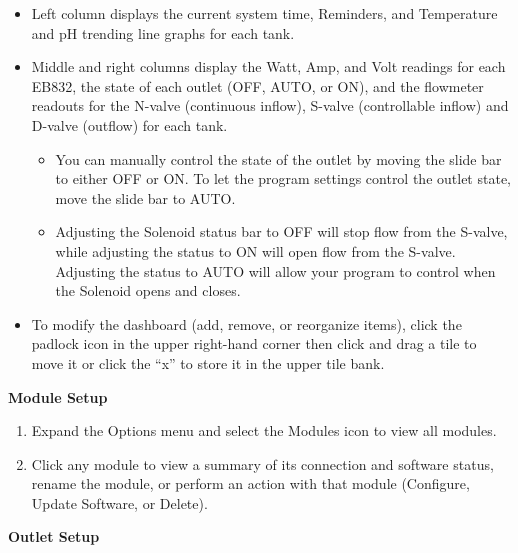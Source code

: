 \documentclass[
]{book}
\providecommand{\tightlist}{%
  \setlength{\itemsep}{0pt}\setlength{\parskip}{0pt}}
\begin{document}
\begin{itemize}
\tightlist
\item
  Left column displays the current system time, Reminders, and Temperature and pH trending line graphs for each tank.
\item
  Middle and right columns display the Watt, Amp, and Volt readings for each EB832, the state of each outlet (OFF, AUTO, or ON), and the flowmeter readouts for the N-valve (continuous inflow), S-valve (controllable inflow) and D-valve (outflow) for each tank.

  \begin{itemize}
  \tightlist
  \item
    You can manually control the state of the outlet by moving the slide bar to either OFF or ON. To let the program settings control the outlet state, move the slide bar to AUTO.
  \item
    Adjusting the Solenoid status bar to OFF will stop flow from the S-valve, while adjusting the status to ON will open flow from the S-valve. Adjusting the status to AUTO will allow your program to control when the Solenoid opens and closes.
  \end{itemize}
\item
  To modify the dashboard (add, remove, or reorganize items), click the padlock icon in the upper right-hand corner then click and drag a tile to move it or click the ``x'' to store it in the upper tile bank.
\end{itemize}

\textbf{Module Setup}

\begin{enumerate}
\def\labelenumi{\arabic{enumi}.}
\tightlist
\item
  Expand the Options menu and select the Modules icon to view all modules.
\item
  Click any module to view a summary of its connection and software status, rename the module, or perform an action with that module (Configure, Update Software, or Delete).
\end{enumerate}

\textbf{Outlet Setup}
\end{document}
